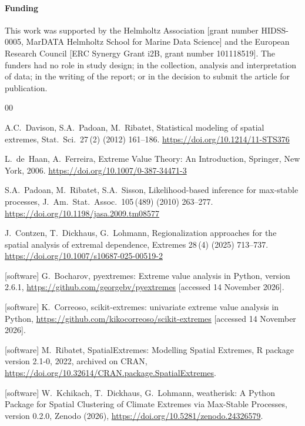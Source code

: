 \documentclass[preprint,12pt,a4paper]{elsarticle}
\newcommand{\rev}[1]{{#1}}
\begin{document}
\paragraph*{Funding}
This work was supported by the Helmholtz Association [grant number
HIDSS-0005, MarDATA Helmholtz School for Marine Data Science] and the
European Research Council [ERC Synergy Grant i2B, grant number
101118519]. The funders had no role in study design; in the
collection, analysis and interpretation of data; in the writing of
the report; or in the decision to submit the article for
publication.


\begin{thebibliography}{00}

A.C.~Davison, S.A.~Padoan, M.~Ribatet,
Statistical modeling of spatial extremes,
Stat.\ Sci.\ 27\,(2) (2012) 161--186.
\url{https://doi.org/10.1214/11-STS376}

L.~de~Haan, A.~Ferreira,
Extreme Value Theory: An Introduction,
Springer, New York, 2006.
\url{https://doi.org/10.1007/0-387-34471-3}

S.A.~Padoan, M.~Ribatet, S.A.~Sisson,
Likelihood-based inference for max-stable processes,
J.\ Am.\ Stat.\ Assoc.\ 105\,(489) (2010) 263--277.
\url{https://doi.org/10.1198/jasa.2009.tm08577}

\rev{J.~Contzen, T.~Dickhaus, G.~Lohmann,
Regionalization approaches for the spatial analysis of extremal
dependence,
Extremes 28\,(4) (2025) 713--737.
\url{https://doi.org/10.1007/s10687-025-00519-2}}

[software] G.~Bocharov,
pyextremes: Extreme value analysis in Python, version 2.6.1,
\url{https://github.com/georgebv/pyextremes} [accessed 14
November 2026].

[software] K.~Correoso,
scikit-extremes: univariate extreme value analysis in Python,
\url{https://github.com/kikocorreoso/scikit-extremes}
[accessed 14 November 2026].

[software] M.~Ribatet,
SpatialExtremes: Modelling Spatial Extremes,
R package version 2.1-0, 2022, archived on CRAN,
\url{https://doi.org/10.32614/CRAN.package.SpatialExtremes}.

[software] W.~Kchikach, T.~Dickhaus, G.~Lohmann,
weatherisk: A Python Package for Spatial Clustering of Climate
Extremes via Max-Stable Processes, version 0.2.0, Zenodo (2026),
\url{https://doi.org/10.5281/zenodo.24326579}.


\end{thebibliography}
\end{document}
